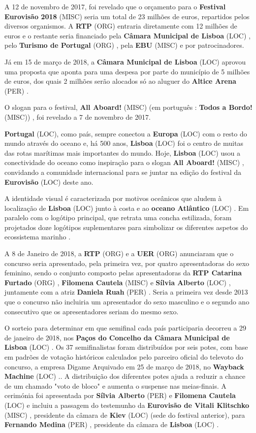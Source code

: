 \documentclass[12pt,a4paper]{article}
\begin{document}
A 12 de novembro de 2017, foi revelado que o orçamento para o \textbf{Festival Eurovisão 2018} (MISC) seria um total de 23 milhões de euros, repartidos pelos diversos organismos. A \textbf{RTP} (ORG) entraria diretamente com 12 milhões de euros e o restante seria financiado pela \textbf{Câmara Municipal de Lisboa} (LOC) , pelo \textbf{Turismo de Portugal} (ORG) , pela \textbf{EBU} (MISC) e por patrocinadores.

Já em 15 de março de 2018, a \textbf{Câmara Municipal de Lisboa} (LOC) aprovou uma proposta que aponta para uma despesa por parte do município de 5 milhões de euros, dos quais 2 milhões serão alocados só ao aluguer do \textbf{Altice Arena} (PER) .

O slogan para o festival, \textbf{All Aboard!} (MISC) (em português : \textbf{Todos a Bordo!} (MISC)) , foi revelado a 7 de novembro de 2017.

\textbf{Portugal} (LOC), como país, sempre conectou a \textbf{Europa} (LOC) com o resto do mundo através do oceano e, há 500 anos, \textbf{Lisboa} (LOC) foi o centro de muitas das rotas marítimas mais importantes do mundo. Hoje, \textbf{Lisboa} (LOC) usou a conectividade do oceano como inspiração para o slogan \textbf{All Aboard!} (MISC) , convidando a comunidade internacional para se juntar na edição do festival da \textbf{Eurovisão} (LOC) deste ano.

A identidade visual é caracterizada por motivos oceânicos que aludem à localização de \textbf{Lisboa} (LOC) junto à costa e ao \textbf{oceano Atlântico} (LOC) . Em paralelo com o logótipo principal, que retrata uma concha estilizada, foram projetados doze logótipos suplementares para simbolizar os diferentes aspetos do ecossistema marinho .

A 8 de Janeiro de 2018, a \textbf{RTP} (ORG) e a \textbf{UER} (ORG) anunciaram que o concurso seria apresentado, pela primeira vez, por quatro apresentadoras do sexo feminino, sendo o conjunto composto pelas apresentadoras da \textbf{RTP Catarina Furtado} (ORG) , \textbf{Filomena Cautela} (MISC) e \textbf{Sílvia Alberto} (LOC) , juntamente com a atriz \textbf{Daniela Ruah} (PER) . Seria a primeira vez desde 2013 que o concurso não incluiria um apresentador do sexo masculino e o segundo ano consecutivo que os apresentadores seriam do mesmo sexo.

O sorteio para determinar em que semifinal cada país participaria decorreu a 29 de janeiro de 2018, nos \textbf{Paços do Concelho da Câmara Municipal de Lisboa} (LOC) . Os 37 semifinalistas foram distribuídos por seis potes, com base em padrões de votação históricos calculados pelo parceiro oficial do televoto do concurso, a empresa Digame Arquivado em 25 de março de 2018, no \textbf{Wayback Machine} (LOC) .. A distribuição dos diferentes potes ajuda a reduzir a chance de um chamado "voto de bloco" e aumenta o suspense nas meias-finais. A cerimónia foi apresentada por \textbf{Sílvia Alberto} (PER) e \textbf{Filomena Cautela} (LOC) e incluiu a passagem do testemunho da \textbf{Eurovisão de Vitali Klitschko} (MISC) , presidente da câmara de \textbf{Kiev} (LOC) (sede do festival anterior), para \textbf{Fernando Medina} (PER) , presidente da câmara de \textbf{Lisboa} (LOC) .
\end{document}
